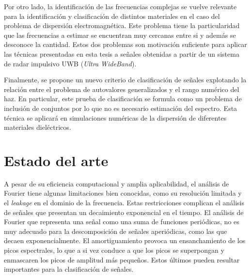 Por otro lado, la identificación de las frecuencias complejas se vuelve relevante para la identificación y clasificación de distintos materiales en el caso del problema de dispersión electromagnética. Este problema tiene la particularidad que las frecuencias a estimar se encuentran muy cercanas entre si y además se desconoce la cantidad. Estos dos problemas son motivación suficiente para aplicar las técnicas presentadas en esta tesis a señales obtenidas a partir de un sistema de radar impulsivo UWB (\emph{Ultra WideBand}). 

Finalmente, se propone un nuevo criterio de clasificación de señales explotando la relación entre el problema de autovalores generalizados y el rango numérico del haz. En particular, este prueba de clasificación se formula como un problema de inclusión de conjuntos por lo que no es necesario estimación del espectro. Esta técnica se aplicará en simulaciones numéricas de la dispersión de diferentes materiales dieléctricos.




\section{Estado del arte}
A pesar de su eficiencia computacional y amplia aplicabilidad, el análisis de Fourier tiene algunas limitaciones bien conocidas, como su resolución limitada y el \emph{leakage} en el dominio de la frecuencia. Estas restricciones complican el análisis de señales que presentan un decaimiento exponencial en el tiempo. El análisis de Fourier que representa una señal como una suma de funciones periódicas, no es muy adecuado para la descomposición de señales aperiódicas, como las que decaen exponencialmente. El amortiguamiento provoca un ensanchamiento de los picos espectrales, lo que a si vez conduce a que los picos se superpongan y enmascaren los picos de amplitud más pequeños. Estos últimos pueden resultar importantes para la clasificación de señales. 

